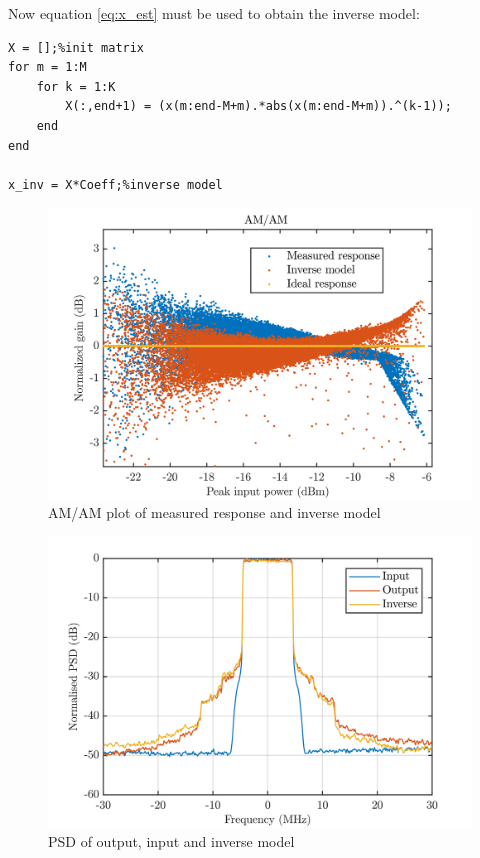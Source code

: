 Now equation \ref{eq:x_est} must be used to obtain the inverse model:

\begin{lstlisting}[frame = single]
X = [];%init matrix
for m = 1:M
    for k = 1:K
        X(:,end+1) = (x(m:end-M+m).*abs(x(m:end-M+m)).^(k-1));
    end
end

x_inv = X*Coeff;%inverse model
\end{lstlisting}

\begin{figure}[H]
\centering 
\includegraphics[scale = 0.7]{figures/measurement/predis.png}
\caption{AM/AM plot of measured response and inverse model}
\label{fig:pre_cons}
\end{figure}

\begin{figure}[H]
\centering 
\includegraphics[scale = 0.7]{figures/measurement/psd_dpd.png}
\caption{PSD of output, input and inverse model}
\label{fig:pre_cons}
\end{figure}

